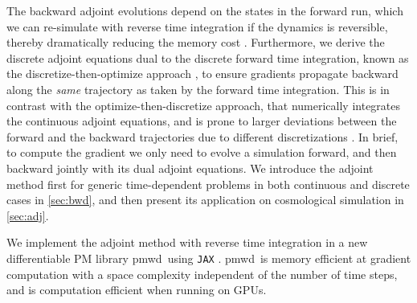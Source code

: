 \documentclass[modern, dvipsnames]{aastex631}
\newcommand{\pmwd}{{\usefont{T1}{nova}{m}{sl}pmwd}}
\begin{document}
The backward adjoint evolutions depend on the states in the forward run,
which we can re-simulate with reverse time integration if the dynamics
is reversible, thereby dramatically reducing the memory cost
\citep{NeuralODE}.
Furthermore, we derive the discrete adjoint equations dual to the
discrete forward time integration, known as the discretize-then-optimize
approach \citep[e.g.,][]{ANODE}, to ensure gradients propagate backward
along the \emph{same} trajectory as taken by the forward time
integration.
This is in contrast with the optimize-then-discretize approach, that
numerically integrates the continuous adjoint equations, and is prone to
larger deviations between the forward and the backward trajectories due
to different discretizations \citep{LanzieriLanusseEtAl2022}.
In brief, to compute the gradient we only need to evolve a simulation
forward, and then backward jointly with its dual adjoint equations.
We introduce the adjoint method first for generic time-dependent
problems in both continuous and discrete cases in \autoref{sec:bwd}, and
then present its application on cosmological simulation in
\autoref{sec:adj}.

We implement the adjoint method with reverse time integration in a new
differentiable PM library \pmwd\ using \texttt{JAX} \citep{pmwd}.
\pmwd\ is memory efficient at gradient computation with a space
complexity independent of the number of time steps, and is computation
efficient when running on GPUs.
\end{document}
